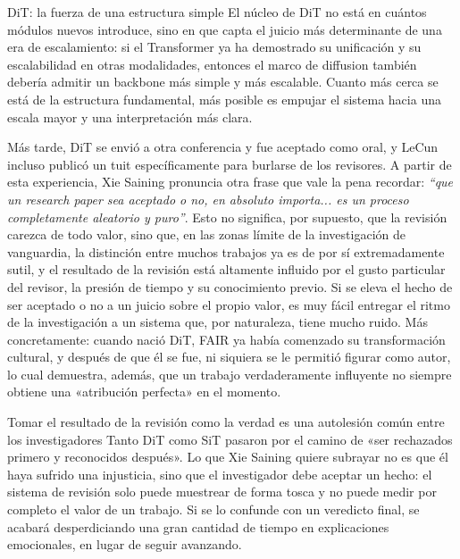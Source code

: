 \begin{importantbox}{DiT: la fuerza de una estructura simple}
El núcleo de DiT no está en cuántos módulos nuevos introduce, sino en que capta el juicio más determinante de una era de escalamiento: si el Transformer ya ha demostrado su unificación y su escalabilidad en otras modalidades, entonces el marco de diffusion también debería admitir un backbone más simple y más escalable. Cuanto más cerca se está de la estructura fundamental, más posible es empujar el sistema hacia una escala mayor y una interpretación más clara.
\end{importantbox}

Más tarde, DiT se envió a otra conferencia y fue aceptado como oral, y LeCun incluso publicó un tuit específicamente para burlarse de los revisores. A partir de esta experiencia, Xie Saining pronuncia otra frase que vale la pena recordar: \textit{``que un research paper sea aceptado o no, en absoluto importa... es un proceso completamente aleatorio y puro''}. Esto no significa, por supuesto, que la revisión carezca de todo valor, sino que, en las zonas límite de la investigación de vanguardia, la distinción entre muchos trabajos ya es de por sí extremadamente sutil, y el resultado de la revisión está altamente influido por el gusto particular del revisor, la presión de tiempo y su conocimiento previo. Si se eleva el hecho de ser aceptado o no a un juicio sobre el propio valor, es muy fácil entregar el ritmo de la investigación a un sistema que, por naturaleza, tiene mucho ruido. Más concretamente: cuando nació DiT, FAIR ya había comenzado su transformación cultural, y después de que él se fue, ni siquiera se le permitió figurar como autor, lo cual demuestra, además, que un trabajo verdaderamente influyente no siempre obtiene una «atribución perfecta» en el momento.

\begin{warningbox}{Tomar el resultado de la revisión como la verdad es una autolesión común entre los investigadores}
Tanto DiT como SiT pasaron por el camino de «ser rechazados primero y reconocidos después». Lo que Xie Saining quiere subrayar no es que él haya sufrido una injusticia, sino que el investigador debe aceptar un hecho: el sistema de revisión solo puede muestrear de forma tosca y no puede medir por completo el valor de un trabajo. Si se lo confunde con un veredicto final, se acabará desperdiciando una gran cantidad de tiempo en explicaciones emocionales, en lugar de seguir avanzando.
\end{warningbox}

